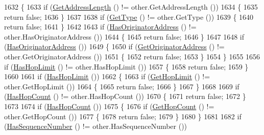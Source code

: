 \begin{DoxyCode}
1632 \{
1633   \textcolor{keywordflow}{if} (\hyperlink{classns3_1_1PbbMessage_abc3011e4ca197ddc8ae7a9a1f18d779f}{GetAddressLength} () != other.GetAddressLength ())
1634     \{
1635       \textcolor{keywordflow}{return} \textcolor{keyword}{false};
1636     \}
1637 
1638   \textcolor{keywordflow}{if} (\hyperlink{classns3_1_1PbbMessage_ad720b67118bbe16669019b7344903cd9}{GetType} () != other.GetType ())
1639     \{
1640       \textcolor{keywordflow}{return} \textcolor{keyword}{false};
1641     \}
1642 
1643   \textcolor{keywordflow}{if} (\hyperlink{classns3_1_1PbbMessage_a7d64dd0abb8306bb13cb6f1124f35c3c}{HasOriginatorAddress} () != other.HasOriginatorAddress ())
1644     \{
1645       \textcolor{keywordflow}{return} \textcolor{keyword}{false};
1646     \}
1647 
1648   \textcolor{keywordflow}{if} (\hyperlink{classns3_1_1PbbMessage_a7d64dd0abb8306bb13cb6f1124f35c3c}{HasOriginatorAddress} ())
1649     \{
1650       \textcolor{keywordflow}{if} (\hyperlink{classns3_1_1PbbMessage_a28eaf6a89ecf70e54ecf4ae11971f074}{GetOriginatorAddress} () != other.GetOriginatorAddress ())
1651         \{
1652           \textcolor{keywordflow}{return} \textcolor{keyword}{false};
1653         \}
1654     \}
1655 
1656   \textcolor{keywordflow}{if} (\hyperlink{classns3_1_1PbbMessage_a5bad52e536a9a2116a7f66b3c8d2054b}{HasHopLimit} () != other.HasHopLimit ())
1657     \{
1658       \textcolor{keywordflow}{return} \textcolor{keyword}{false};
1659     \}
1660 
1661   \textcolor{keywordflow}{if} (\hyperlink{classns3_1_1PbbMessage_a5bad52e536a9a2116a7f66b3c8d2054b}{HasHopLimit} ())
1662     \{
1663       \textcolor{keywordflow}{if} (\hyperlink{classns3_1_1PbbMessage_a938893c819b1f04baa8738cbc3ea6d19}{GetHopLimit} () != other.GetHopLimit ())
1664         \{
1665           \textcolor{keywordflow}{return} \textcolor{keyword}{false};
1666         \}
1667     \}
1668 
1669   \textcolor{keywordflow}{if} (\hyperlink{classns3_1_1PbbMessage_ac6c535503fda3849f8ab99792416efd2}{HasHopCount} () != other.HasHopCount ())
1670     \{
1671       \textcolor{keywordflow}{return} \textcolor{keyword}{false};
1672     \}
1673 
1674   \textcolor{keywordflow}{if} (\hyperlink{classns3_1_1PbbMessage_ac6c535503fda3849f8ab99792416efd2}{HasHopCount} ())
1675     \{
1676       \textcolor{keywordflow}{if} (\hyperlink{classns3_1_1PbbMessage_a1941a4d881175d211f12970b54ceb483}{GetHopCount} () != other.GetHopCount ())
1677         \{
1678           \textcolor{keywordflow}{return} \textcolor{keyword}{false};
1679         \}
1680     \}
1681 
1682   \textcolor{keywordflow}{if} (\hyperlink{classns3_1_1PbbMessage_a1b3faaca8d6f9b2ca7c1abe5a7a72d82}{HasSequenceNumber} () != other.HasSequenceNumber ())

\end{DoxyCode}
